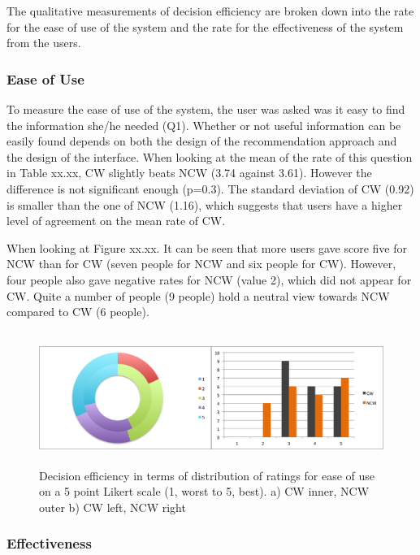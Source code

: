 The qualitative measurements of decision efficiency are broken down into the rate for the ease of use of the system and the rate for the effectiveness of the system from the users.

\subsubsection{Ease of Use} \label{sec:results_de_eu}

To measure the ease of use of the system, the user was asked was it easy to find the information she/he needed (Q1). Whether or not useful information can be easily found depends on both the design of the recommendation approach and the design of the interface. When looking at the mean of the rate of this question in Table xx.xx, CW slightly beats NCW (3.74 against 3.61). However the difference is not significant enough (p=0.3). The standard deviation of CW (0.92) is smaller than the one of NCW (1.16), which suggests that users have a higher level of agreement on the mean rate of CW.

When looking at Figure xx.xx. It can be seen that more users gave score five for NCW than for CW (seven people for NCW and six people for CW). However, four people also gave negative rates for NCW (value 2), which did not appear for CW. Quite a number of people (9 people) hold a neutral view towards NCW compared to CW (6 people).

\begin{figure}[H]
	\centering
	\includegraphics[height=1.7in]{figures/easeOfUse.png}
	\caption{Decision efficiency in terms of distribution of ratings for ease of use on a 5 point Likert scale (1, worst to 5, best). a) CW inner, NCW outer b) CW left, NCW right}
	\label{fig:easeOfUse}
\end{figure}

\subsubsection{Effectiveness} \label{sec:results_de_e}

